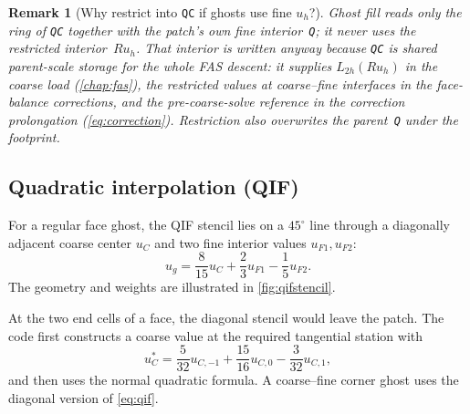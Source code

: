 \documentclass[11pt,oneside,openany]{book}
\newcommand{\code}[1]{\textnormal{\texttt{#1}}}
\newtheorem{remark}{Remark}[chapter]
\begin{document}
\begin{remark}[Why restrict into \code{QC} if ghosts use fine \texorpdfstring{$u_h$}{u\_h}?]
\label{rem:qc-interior}
Ghost fill reads only the \emph{ring} of \code{QC} together with the patch's own fine interior~\code{Q}; it never uses the restricted interior~$Ru_h$. That interior is written anyway because \code{QC} is shared parent-scale storage for the whole FAS descent: it supplies $L_{2h}(Ru_h)$ in the coarse load (\cref{chap:fas}), the restricted values at coarse--fine interfaces in the face-balance corrections, and the pre-coarse-solve reference in the correction prolongation (\cref{eq:correction}). Restriction also overwrites the parent~\code{Q} under the footprint.
\end{remark}

\subsection{Quadratic interpolation (QIF)}
For a regular face ghost, the QIF stencil lies on a $45^\circ$ line through a diagonally adjacent coarse center $u_C$ and two fine interior values $u_{F1},u_{F2}$:
\begin{equation}
  u_g=\frac{8}{15}u_C+\frac23u_{F1}-\frac15u_{F2}.
  \label{eq:qif}
\end{equation}
The geometry and weights are illustrated in \cref{fig:qifstencil}.

At the two end cells of a face, the diagonal stencil would leave the patch. The code first constructs a coarse value at the required tangential station with
\begin{equation}
  u_C^*=\frac{5}{32}u_{C,-1}+\frac{15}{16}u_{C,0}-\frac{3}{32}u_{C,1},
  \label{eq:qifend}
\end{equation}
and then uses the normal quadratic formula. A coarse--fine corner ghost uses the diagonal version of \cref{eq:qif}.
\end{document}

